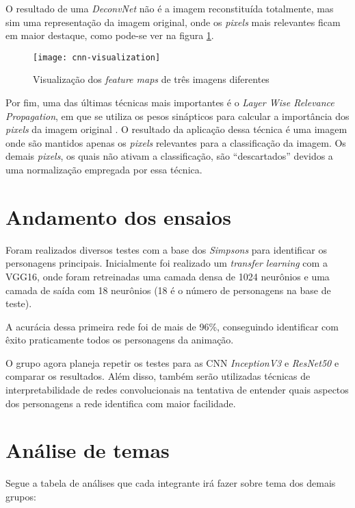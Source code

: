 O resultado de uma \textit{DeconvNet} não é a imagem reconstituída totalmente, mas sim uma representação da imagem original, onde os \textit{pixels} mais relevantes ficam em maior destaque, como pode-se ver na figura \ref{fig:cnn-visualization}.

\begin{figure}[h]
    \caption{Visualização dos \textit{feature maps} de três imagens diferentes \cite{zeiler2014visualizing}}
    \texttt{[image: cnn-visualization]}
    \centering
    \label{fig:cnn-visualization}
\end{figure}

Por fim, uma das últimas técnicas mais importantes é o \textit{Layer Wise Relevance Propagation}, em que se utiliza os pesos sinápticos para calcular a importância dos \textit{pixels} da imagem original \cite{chollet2017deep}. O resultado da aplicação dessa técnica é uma imagem onde são mantidos apenas os \textit{pixels} relevantes para a classificação da imagem. Os demais \textit{pixels}, os quais não ativam a classificação, são “descartados” devidos a uma normalização empregada por essa técnica.

\chapter{Andamento dos ensaios}

Foram realizados diversos testes com a base dos \textit{Simpsons} para identificar os personagens principais. Inicialmente foi realizado um \textit{transfer learning} com a VGG16, onde foram retreinadas uma camada densa de 1024 neurônios e uma camada de saída com 18 neurônios (18 é o número de personagens na base de teste).

A acurácia dessa primeira rede foi de mais de 96\%, conseguindo identificar com êxito praticamente todos os personagens da animação.

O grupo agora planeja repetir os testes para as CNN \textit{InceptionV3} e \textit{ResNet50} e comparar os resultados. Além disso, também serão utilizadas técnicas de interpretabilidade de redes convolucionais na tentativa de entender quais aspectos dos personagens a rede identifica com maior facilidade. 

\chapter{Análise de temas}

Segue a tabela de análises que cada integrante irá fazer sobre tema dos demais grupos:

